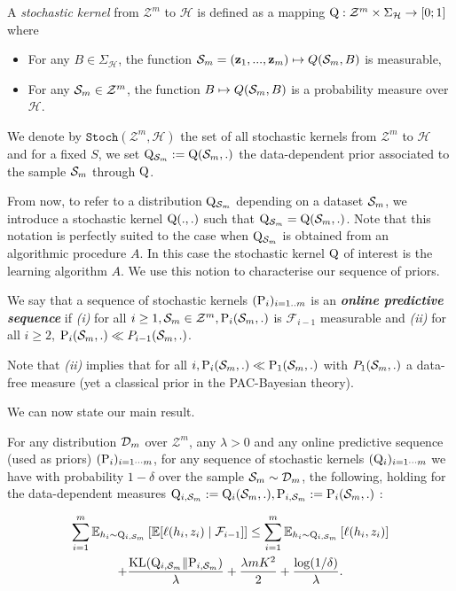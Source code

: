 \begin{definition}
    A \emph{stochastic kernel} from $\mathcal{Z}^m$ to $\mathcal{H}$ is defined as a mapping $\Q: \mathcal{Z}^m\times \Sigma_{\mathcal{H}} \rightarrow [0;1]$ where
    \begin{itemize}
        \item For any $B\in \Sigma_{\mathcal{H}}$, the function  $\Sm=(\z_1,...,\z_m)\mapsto Q(\Sm,B)$ is measurable,
        \item For any $\Sm\in\mathcal{Z}^m$, the function $B\mapsto Q(\Sm,B)$ is a probability measure over $\mathcal{H}$.
    \end{itemize}
    We denote by $\texttt{Stoch}(\mathcal{Z}^m,\mathcal{H})$ the set of all stochastic kernels from $\mathcal{Z}^m$ to $\mathcal{H}$ and for a fixed $S$, we set $\Q_{\Sm}:= \Q(\Sm,.)$ the data-dependent prior associated to the sample $\Sm$ through $\Q$.
\end{definition}

From now, to refer to a distribution $\Q_{\Sm}$ depending on a dataset $\Sm$, we introduce a stochastic kernel $\Q(.,.)$ such that $\Q_{\Sm} = \Q(\Sm,.)$. Note that this notation is perfectly suited to the case when $\Q_{\Sm}$ is obtained from an algorithmic procedure $A$. In this case the stochastic kernel $\Q$ of interest is the learning algorithm $A$.
We use this notion to characterise our sequence of priors.

\begin{definition}
  We say that a sequence of stochastic kernels $(\P_{i})_{i=1..m}$ is an \emph{\textbf{online predictive sequence}} if \textit{(i)} for all $i\geq 1, \Sm\in\mathcal{Z}^m, \P_{i}(\Sm,.)$ is $\mathcal{F}_{i-1}$ measurable and \textit{(ii)} for all $i \geq 2$, $\P_{i}(\Sm,.)\ll P_{i-1}(\Sm,.)$.
\end{definition}

Note that \textit{(ii)} implies that for all $i, \P_{i}(\Sm,.)\ll \P_1(\Sm,.)$ with $P_1(\Sm,.)$ a data-free measure (yet a classical prior in the PAC-Bayesian theory).


We can now state our main result.

\begin{theorem}
  \label{th: main_thm_online}
  For any distribution $\Dm$ over $\mathcal{Z}^m$, any $\lambda>0$ and any online predictive sequence (used as priors) $(\P_{i})_{i=1\cdots m}$, for any sequence of stochastic kernels $(\Q_{i})_{i=1\cdots m}$ we have with probability $1-\delta$ over the sample $\Sm\sim\Dm$, the following, holding for the data-dependent measures $\Q_{i,\Sm}:= \Q_{i}(\Sm,.), \P_{i,\Sm}:= \P_{i}(\Sm,.)$ :

  \begin{multline*} 
    \sum_{i=1}^m \mathbb{E}_{h_i\sim \Q_{i,\Sm}}\left[ \mathbb{E}[\ell(h_i,z_i) \mid \mathcal{F}_{i-1}]    \right]  \leq \sum_{i=1}^m \mathbb{E}_{h_i\sim \Q_{i,\Sm}}\left[ \ell(h_i,z_i) \right] \\
    + \frac{\operatorname{KL}(\Q_{i,\Sm}\| \P_{i,\Sm})}{\lambda} + \frac{\lambda m K^2}{2} + \frac{\log(1/\delta)}{\lambda}. \end{multline*}

\end{theorem}

